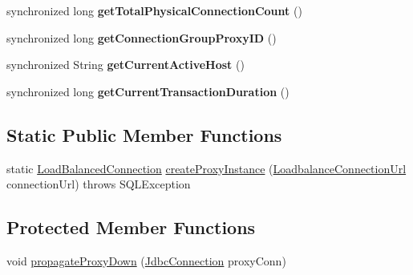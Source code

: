 \begin{DoxyCompactItemize}
synchronized long {\bfseries get\+Total\+Physical\+Connection\+Count} ()
\item 
\mbox{\label{classcom_1_1mysql_1_1cj_1_1jdbc_1_1ha_1_1_load_balanced_connection_proxy_a34c97945360e9b266c0f6430797769bd}} 
synchronized long {\bfseries get\+Connection\+Group\+Proxy\+ID} ()
\item 
\mbox{\label{classcom_1_1mysql_1_1cj_1_1jdbc_1_1ha_1_1_load_balanced_connection_proxy_a20e2022c18d8a82ca349b33b46a1f36f}} 
synchronized String {\bfseries get\+Current\+Active\+Host} ()
\item 
\mbox{\label{classcom_1_1mysql_1_1cj_1_1jdbc_1_1ha_1_1_load_balanced_connection_proxy_acfcd1603c08d3641fdbef195539f2e46}} 
synchronized long {\bfseries get\+Current\+Transaction\+Duration} ()
\end{DoxyCompactItemize}
\subsection*{Static Public Member Functions}
\begin{DoxyCompactItemize}
\item 
static \mbox{\hyperlink{interfacecom_1_1mysql_1_1cj_1_1jdbc_1_1ha_1_1_load_balanced_connection}{Load\+Balanced\+Connection}} \mbox{\hyperlink{classcom_1_1mysql_1_1cj_1_1jdbc_1_1ha_1_1_load_balanced_connection_proxy_afc3968a242b38d47fdd116d3fdb8ac73}{create\+Proxy\+Instance}} (\mbox{\hyperlink{classcom_1_1mysql_1_1cj_1_1conf_1_1url_1_1_loadbalance_connection_url}{Loadbalance\+Connection\+Url}} connection\+Url)  throws S\+Q\+L\+Exception 
\end{DoxyCompactItemize}
\subsection*{Protected Member Functions}
\begin{DoxyCompactItemize}
\item 
void \mbox{\hyperlink{classcom_1_1mysql_1_1cj_1_1jdbc_1_1ha_1_1_load_balanced_connection_proxy_a881993ea0bb478eade30076498853833}{propagate\+Proxy\+Down}} (\mbox{\hyperlink{interfacecom_1_1mysql_1_1cj_1_1jdbc_1_1_jdbc_connection}{Jdbc\+Connection}} proxy\+Conn)
\end{DoxyCompactItemize}
